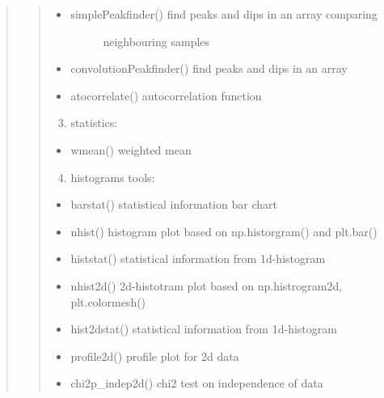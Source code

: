 \documentclass[letterpaper,10pt,english]{sphinxmanual}
\begin{document}
\begin{quote}
\begin{quote}
\begin{itemize}
\item {} \begin{description}
\item[{simplePeakfinder() find peaks and dips in an array comparing }] \leavevmode
neighbouring samples  

\end{description}

\item {} 
convolutionPeakfinder() find peaks and dips in an array

\item {} 
atocorrelate()     autocorrelation function

\end{itemize}
\begin{enumerate}
\setcounter{enumi}{2}
\item {} 
statistics:

\end{enumerate}
\begin{itemize}
\item {} 
wmean()  weighted mean

\end{itemize}
\begin{enumerate}
\setcounter{enumi}{3}
\item {} 
histograms tools:

\end{enumerate}
\begin{itemize}
\item {} 
barstat()   statistical information bar chart

\item {} 
nhist()    histogram plot based on np.historgram() and plt.bar()

\item {} 
histstat() statistical information from 1d-histogram

\item {} 
nhist2d()  2d-histotram plot based on np.histrogram2d, plt.colormesh()

\item {} 
hist2dstat() statistical information from 1d-histogram

\item {} 
profile2d()  \sphinxquotedblleft{}profile plot\sphinxquotedblright{} for 2d data

\item {} 
chi2p\_indep2d() chi2 test on independence of data


\end{itemize}
\end{quote}
\end{quote}
\end{document}
